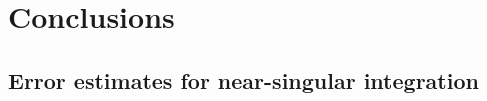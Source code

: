 \documentclass[preprint, 10pt]{elsarticle}
\begin{document}
\section{Conclusions\label{s:conclusions}}


\begin{appendices}
\section{Error estimates for near-singular integration \label{A:AppendixA}} 
\end{appendices}


 

\end{document}
